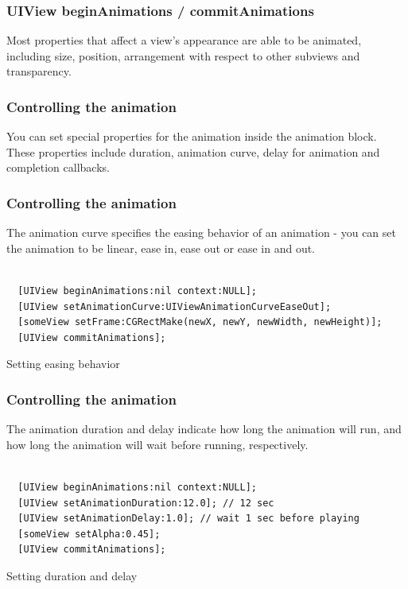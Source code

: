 \documentclass[10pt]{beamer}
\begin{document}
\begin{frame}[fragile]
  \frametitle{UIView beginAnimations / commitAnimations}
  Most properties that affect a view's appearance are able to be animated, including size, position, arrangement with respect to other subviews  and transparency.

\end{frame}

    
\begin{frame}[fragile]
  \frametitle{Controlling the animation}
  You can set special properties for the animation inside the animation block. These properties include duration, animation curve, delay for animation and completion callbacks.

\end{frame}

\begin{frame}[fragile]
  \frametitle{Controlling the animation}
  The animation curve specifies the easing behavior of an animation - you can set the animation to be linear, ease in, ease out or ease in and out. \begin{listing}[H]
    \begin{verbatim}

  [UIView beginAnimations:nil context:NULL];
  [UIView setAnimationCurve:UIViewAnimationCurveEaseOut];
  [someView setFrame:CGRectMake(newX, newY, newWidth, newHeight)];
  [UIView commitAnimations];

  \end{verbatim}
    \caption{Setting easing behavior}
    \label{listing:35}
  \end{listing}

\end{frame}

\begin{frame}[fragile]
  \frametitle{Controlling the animation}
  The animation duration and delay indicate how long the animation will run, and how long the animation will wait before running, respectively. \begin{listing}[H]
    \begin{verbatim}

  [UIView beginAnimations:nil context:NULL];
  [UIView setAnimationDuration:12.0]; // 12 sec
  [UIView setAnimationDelay:1.0]; // wait 1 sec before playing
  [someView setAlpha:0.45];
  [UIView commitAnimations];

  \end{verbatim}
    \caption{Setting duration and delay}
    \label{listing:36}
  \end{listing}

\end{frame}
\end{document}
